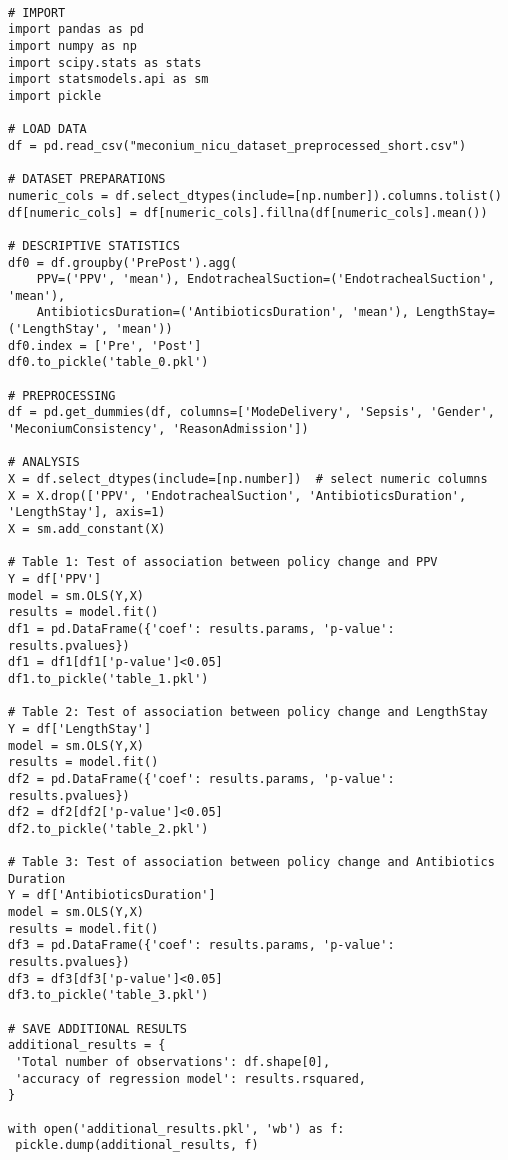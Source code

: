 \documentclass[11pt]{article}
\begin{document}
\begin{verbatim}

# IMPORT
import pandas as pd
import numpy as np
import scipy.stats as stats
import statsmodels.api as sm
import pickle

# LOAD DATA
df = pd.read_csv("meconium_nicu_dataset_preprocessed_short.csv")

# DATASET PREPARATIONS
numeric_cols = df.select_dtypes(include=[np.number]).columns.tolist()
df[numeric_cols] = df[numeric_cols].fillna(df[numeric_cols].mean())

# DESCRIPTIVE STATISTICS
df0 = df.groupby('PrePost').agg(
    PPV=('PPV', 'mean'), EndotrachealSuction=('EndotrachealSuction', 'mean'), 
    AntibioticsDuration=('AntibioticsDuration', 'mean'), LengthStay=('LengthStay', 'mean'))
df0.index = ['Pre', 'Post']
df0.to_pickle('table_0.pkl')

# PREPROCESSING
df = pd.get_dummies(df, columns=['ModeDelivery', 'Sepsis', 'Gender', 'MeconiumConsistency', 'ReasonAdmission'])

# ANALYSIS
X = df.select_dtypes(include=[np.number])  # select numeric columns
X = X.drop(['PPV', 'EndotrachealSuction', 'AntibioticsDuration', 'LengthStay'], axis=1)
X = sm.add_constant(X)

# Table 1: Test of association between policy change and PPV
Y = df['PPV']
model = sm.OLS(Y,X)
results = model.fit()
df1 = pd.DataFrame({'coef': results.params, 'p-value': results.pvalues})
df1 = df1[df1['p-value']<0.05]
df1.to_pickle('table_1.pkl')

# Table 2: Test of association between policy change and LengthStay
Y = df['LengthStay']
model = sm.OLS(Y,X)
results = model.fit()
df2 = pd.DataFrame({'coef': results.params, 'p-value': results.pvalues})
df2 = df2[df2['p-value']<0.05]
df2.to_pickle('table_2.pkl')

# Table 3: Test of association between policy change and Antibiotics Duration
Y = df['AntibioticsDuration']
model = sm.OLS(Y,X)
results = model.fit()
df3 = pd.DataFrame({'coef': results.params, 'p-value': results.pvalues})
df3 = df3[df3['p-value']<0.05]
df3.to_pickle('table_3.pkl')

# SAVE ADDITIONAL RESULTS
additional_results = {
 'Total number of observations': df.shape[0], 
 'accuracy of regression model': results.rsquared,
}

with open('additional_results.pkl', 'wb') as f:
 pickle.dump(additional_results, f)

\end{verbatim}
\end{document}
